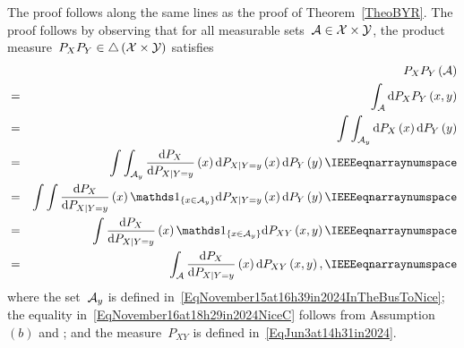 \documentclass[lettersize,onecolumn]{IEEEtran}
\begin{document}
\begin{IEEEproof}
The proof follows along the same lines as the proof of Theorem~\ref{TheoBYR}.
The proof follows by observing that for all measurable sets~$\mathcal A \in \mathcal X \times \mathcal Y$,  the product measure~$P_{X}P_{Y} \in \triangle\left( \mathcal X \times \mathcal Y \right)$ satisfies
\begin{eqnarray}
\nonumber
& & P_{X}P_{Y}  \left(\set{A} \right)  \\
\label{EqNovember16at18h29in2024NiceA}
& = &\int_{\set{A}} \mathrm{d}P_{X}P_{Y}  \left( x, y\right) \\
\label{EqNovember16at18h29in2024NiceB}
& = &\int \int_{\set{A}_{y}} \mathrm{d}P_{X}\left( x\right)  \mathrm{d}P_{Y}  \left(y\right) \\
\label{EqNovember16at18h29in2024NiceC}
& = &\int \int_{\set{A}_{y}}  \frac{\mathrm{d}P_{X}}{\mathrm{d}P_{X | Y = y}} \left( x \right) \mathrm{d}P_{X | Y = y} \left( x \right)  \mathrm{d}P_{Y}  \left(y\right) \spnum \\
\label{EqNovember16at18h29in2024NiceD}
& = &\int \int \frac{\mathrm{d}P_{X}}{\mathrm{d}P_{X | Y = y}} \left( x \right) \ind{x \in \set{A}_{y}}  \mathrm{d}P_{X | Y = y} \left( x \right)  \mathrm{d}P_{Y}  \left(y\right) \spnum \\
\label{EqNovember16at18h29in2024NiceE}
& = &\int \frac{\mathrm{d}P_{X}}{\mathrm{d}P_{X | Y = y}} \left( x \right) \ind{x \in \set{A}_{y}}  \mathrm{d}P_{XY} \left( x, y\right) \spnum \\
\label{EqNovember16at18h29in2024NiceF}
& = &\int_{\set{A}} \frac{\mathrm{d}P_{X}}{\mathrm{d}P_{X | Y = y}} \left( x \right)    \mathrm{d}P_{XY} \left( x, y\right), \spnum 
\end{eqnarray}
where the set~$\mathcal A_{y}$ is defined in~\eqref{EqNovember15at16h39in2024InTheBusToNice}; the equality in~\eqref{EqNovember16at18h29in2024NiceC} follows from Assumption~$(b)$ and \cite[Theorem~$2.2.3$]{lehmann2005testing}; and the measure~$P_{XY}$ is defined in~\eqref{EqJun3at14h31in2024}.


\end{IEEEproof}
\end{document}
